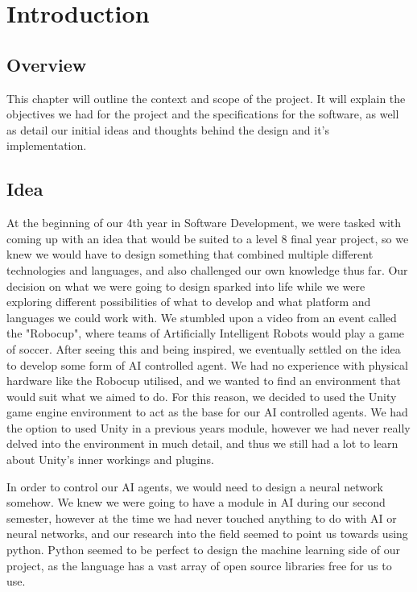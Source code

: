
\chapter{Introduction}

\section{Overview}
This chapter will outline the context and scope of the project. It will explain the objectives we had for the project and the specifications for the software, as well as detail our initial ideas and thoughts behind the design and it's implementation.

\section{Idea}
At the beginning of our 4th year in Software Development, we were tasked with coming up with an idea that would be suited to a level 8 final year project, so we knew we would have to design something that combined multiple different technologies and languages, and also challenged our own knowledge thus far. Our decision on what we were going to design sparked into life while we were exploring different possibilities of what to develop and what platform and languages we could work with. We stumbled upon a video from an event called the "Robocup", where teams of Artificially Intelligent Robots would play a game of soccer. After seeing this and being inspired, we eventually settled on the idea to develop some form of AI controlled agent. We had no experience with physical hardware like the Robocup utilised, and we wanted to find an environment that would suit what we aimed to do. For this reason, we decided to used the Unity game engine environment to act as the base for our AI controlled agents. We had the option to used Unity in a previous years module, however we had never really delved into the environment in much detail, and thus we still had a lot to learn about Unity's inner workings and plugins.

In order to control our AI agents, we would need to design a neural network somehow. We knew we were going to have a module in AI during our second semester, however at the time we had never touched anything to do with AI or neural networks, and our research into the field seemed to point us towards using python. Python seemed to be perfect to design the machine learning side of our project, as the language has a vast array of open source libraries free for us to use.

